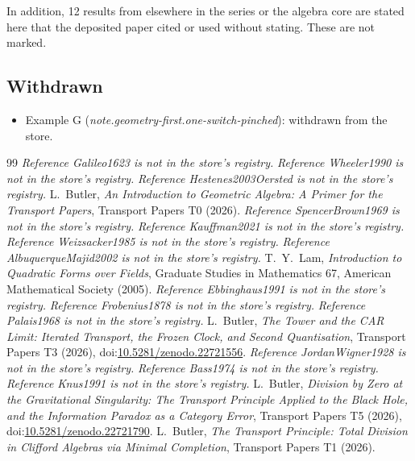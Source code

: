 \documentclass[11pt]{article}
\theoremstyle{definition}
\theoremstyle{plain}
\begin{document}
\noindent In addition, 12 results from elsewhere in the series or the algebra core are stated here that the deposited paper cited or used without stating. These are not marked.
\subsection*{Withdrawn}
\begin{itemize}
\item Example G (\emph{note.geometry-first.one-switch-pinched}): withdrawn from the store.
\end{itemize}
\begin{thebibliography}{99}
 \emph{Reference Galileo1623 is not in the store's registry.}
 \emph{Reference Wheeler1990 is not in the store's registry.}
 \emph{Reference Hestenes2003Oersted is not in the store's registry.}
 L.~Butler,
\emph{An Introduction to Geometric Algebra: A Primer for the Transport Papers},
Transport Papers T0 (2026).
 \emph{Reference SpencerBrown1969 is not in the store's registry.}
 \emph{Reference Kauffman2021 is not in the store's registry.}
 \emph{Reference Weizsacker1985 is not in the store's registry.}
 \emph{Reference AlbuquerqueMajid2002 is not in the store's registry.}
 T.~Y.~Lam,
\emph{Introduction to Quadratic Forms over Fields},
Graduate Studies in Mathematics 67, American Mathematical Society (2005).
 \emph{Reference Ebbinghaus1991 is not in the store's registry.}
 \emph{Reference Frobenius1878 is not in the store's registry.}
 \emph{Reference Palais1968 is not in the store's registry.}
 L.~Butler,
\emph{The Tower and the CAR Limit: Iterated Transport, the Frozen Clock, and Second Quantisation},
Transport Papers T3 (2026), doi:\href{https://doi.org/10.5281/zenodo.22721556}{10.5281/zenodo.22721556}.
 \emph{Reference JordanWigner1928 is not in the store's registry.}
 \emph{Reference Bass1974 is not in the store's registry.}
 \emph{Reference Knus1991 is not in the store's registry.}
 L.~Butler,
\emph{Division by Zero at the Gravitational Singularity: The Transport Principle Applied to the Black Hole, and the Information Paradox as a Category Error},
Transport Papers T5 (2026), doi:\href{https://doi.org/10.5281/zenodo.22721790}{10.5281/zenodo.22721790}.
 L.~Butler,
\emph{The Transport Principle: Total Division in Clifford Algebras via Minimal Completion},
Transport Papers T1 (2026).
\end{thebibliography}
\end{document}
